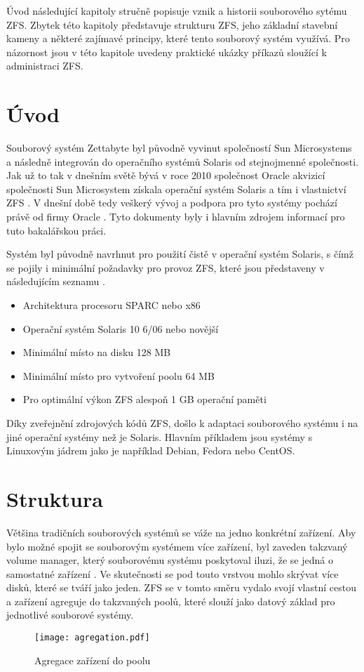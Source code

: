 Úvod následující kapitoly stručně popisuje vznik a historii souborového sytému ZFS. Zbytek této kapitoly představuje strukturu ZFS, jeho základní stavební kameny a některé zajímavé principy, které tento souborový systém využívá. Pro názornost jsou v této kapitole uvedeny praktické ukázky příkazů sloužící k administraci ZFS.

\section{Úvod}
    Souborový systém Zettabyte byl původně vyvinut společností Sun Microsystems a následně integrován do operačního systémů Solaris od stejnojmenné společnosti.
    Jak už to tak v dnešním světě bývá v roce 2010 společnost Oracle akvizicí společnosti Sun Microsystem získala operační systém Solaris a tím i vlastnictví ZFS \cite{suns}. V dnešní době tedy veškerý vývoj a podpora pro tyto systémy pochází právě od firmy Oracle \cite{guide}. Tyto dokumenty byly i hlavním zdrojem informací pro tuto bakalářskou práci.

    Systém byl původně navrhnut pro použití čistě v operační systém Solaris, s čímž se pojily i minimální požadavky pro provoz ZFS, které jsou představeny v následujícím seznamu \cite{requirements}.
    \begin{itemize}
      \item Architektura procesoru SPARC nebo x86
      \item Operační systém Solaris 10 6/06 nebo novější
      \item Minimální místo na disku 128 MB
      \item Minimální místo pro vytvoření poolu 64 MB
      \item Pro optimální výkon ZFS alespoň 1 GB operační paměti
    \end{itemize}

    Díky zveřejnění zdrojových kódů ZFS, došlo k adaptaci souborového systému i na jiné operační systémy než je Solaris. Hlavním příkladem jsou systémy s Linuxovým jádrem jako je například Debian, Fedora nebo CentOS.

\section{Struktura}
Většina tradičních souborových systémů se váže na jedno konkrétní zařízení. Aby bylo možné spojit se souborovým systémem více zařízení, byl zaveden takzvaný volume manager, který souborovému systému poskytoval iluzi, že se jedná o samostatné zařízení \cite{traditional}. Ve skutečnosti se pod touto vrstvou mohlo skrývat více disků, které se tváří jako jeden. ZFS se v tomto směru vydalo svojí vlastní cestou a zařízení agreguje do takzvaných poolů, které slouží jako datový základ pro jednotlivé souborové systémy.
\begin{figure}[!h]
    \caption{Agregace zařízení do poolu}
    \label{agregation}
    \centering
    \texttt{[image: agregation.pdf]}
\end{figure}
